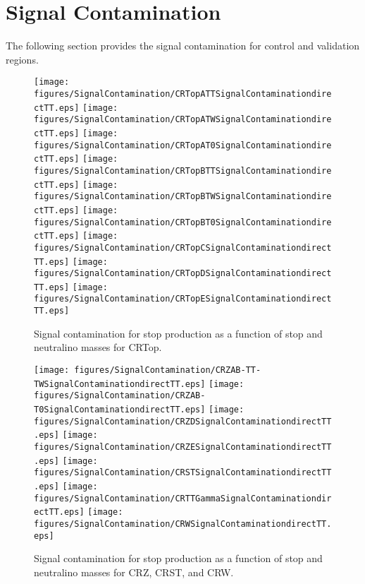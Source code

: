 \chapter{Signal Contamination}

The following section provides the signal contamination for control and validation regions.

\label{sec:signalContamination}



\begin{figure}[htbp]
\begin{center} 
\texttt{[image: figures/SignalContamination/CRTopATTSignalContaminationdirectTT.eps]}
\texttt{[image: figures/SignalContamination/CRTopATWSignalContaminationdirectTT.eps]}
\texttt{[image: figures/SignalContamination/CRTopAT0SignalContaminationdirectTT.eps]}
\texttt{[image: figures/SignalContamination/CRTopBTTSignalContaminationdirectTT.eps]}
\texttt{[image: figures/SignalContamination/CRTopBTWSignalContaminationdirectTT.eps]}
\texttt{[image: figures/SignalContamination/CRTopBT0SignalContaminationdirectTT.eps]}
\texttt{[image: figures/SignalContamination/CRTopCSignalContaminationdirectTT.eps]}
\texttt{[image: figures/SignalContamination/CRTopDSignalContaminationdirectTT.eps]}
\texttt{[image: figures/SignalContamination/CRTopESignalContaminationdirectTT.eps]}
\caption{Signal contamination for stop production as a function of stop and neutralino masses for CRTop.}
\label{fig:Fit2ele}
\end{center}
\end{figure}

\begin{figure}[htbp]
\begin{center} 
\texttt{[image: figures/SignalContamination/CRZAB-TT-TWSignalContaminationdirectTT.eps]}
\texttt{[image: figures/SignalContamination/CRZAB-T0SignalContaminationdirectTT.eps]}
\texttt{[image: figures/SignalContamination/CRZDSignalContaminationdirectTT.eps]}
\texttt{[image: figures/SignalContamination/CRZESignalContaminationdirectTT.eps]}
\texttt{[image: figures/SignalContamination/CRSTSignalContaminationdirectTT.eps]}
\texttt{[image: figures/SignalContamination/CRTTGammaSignalContaminationdirectTT.eps]}
\texttt{[image: figures/SignalContamination/CRWSignalContaminationdirectTT.eps]}
\caption{Signal contamination for stop production as a function of stop and neutralino masses for CRZ, CRST, and CRW.}
\label{fig:Fit2ele}
\end{center}
\end{figure}


